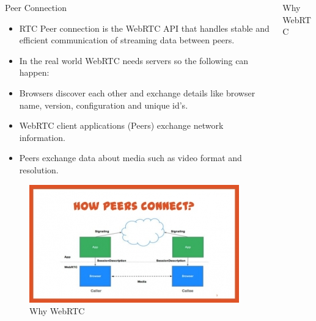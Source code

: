 \documentclass[final]{beamer}
\newlength{\onecolwid}
\newlength{\twocolwid}
\begin{document}
\begin{frame}[t]
\begin{columns}[t]
\begin{column}{\twocolwid}
\begin{columns}[t,totalwidth=\twocolwid]
\begin{column}{\onecolwid}
\begin{block}{Peer Connection}
\begin{itemize}
\item RTC Peer connection is the WebRTC API that handles stable and efficient communication of streaming data between peers.
\item In the real world WebRTC needs servers so the following can happen:
\item Browsers discover each other and exchange details like browser name, version, configuration and unique id's.
\item WebRTC client applications (Peers) exchange network information.
\item Peers exchange data about media such as video format and resolution.
\end{itemize}

\begin{figure}
\includegraphics[width=0.8\linewidth]{peeeeer.jpg}
\caption{Why WebRTC}
\end{figure}

\end{block}


\end{column} %

\begin{column}{\onecolwid} %


\begin{block}{Why WebRTC}


\end{block}
\end{column}
\end{columns}
\end{column}
\end{columns}
\end{frame}
\end{document}
